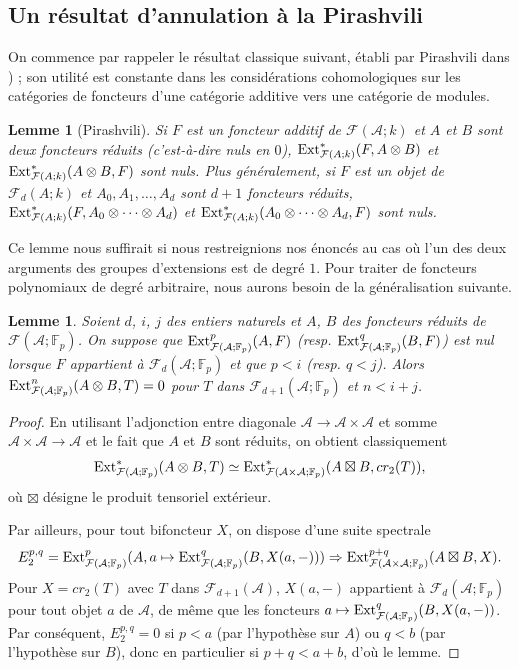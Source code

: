 \documentclass[a4paper,10pt]{article}
\newcommand{\A}{{\mathcal{A}}}
\newcommand{\F}{{\mathcal{F}}}
\newtheorem{lm}[thm]{Lemme}
\theoremstyle{definition}
\theoremstyle{remark}
\begin{document}
\subsection{Un résultat d'annulation à la Pirashvili}

On commence par rappeler le résultat classique suivant, établi par Pirashvili dans \cite{P-add}) ; son utilité est constante dans les considérations cohomologiques sur les catégories de foncteurs d'une catégorie additive vers une catégorie de modules. 

\begin{lm}[Pirashvili]\label{lmpira}
 Si $F$ est un foncteur additif de $\F(\A;k)$ et $A$ et $B$ sont deux foncteurs réduits (c'est-à-dire nuls en $0$), ${\rm Ext}^*_{\F(A;k)}(F,A\otimes B)$ et ${\rm Ext}^*_{\F(A;k)}(A\otimes B,F)$ sont nuls. Plus généralement, si $F$ est un objet de $\F_d(A;k)$ et $A_0,A_1,\dots, A_d$ sont $d+1$ foncteurs réduits, ${\rm Ext}^*_{\F(A;k)}(F,A_0\otimes\dots\otimes A_d)$ et ${\rm Ext}^*_{\F(A;k)}(A_0\otimes\dots\otimes A_d,F)$ sont nuls.
\end{lm}


Ce lemme nous suffirait si nous restreignions nos énoncés au cas où l'un des deux arguments des groupes d'extensions est de degré $1$. Pour traiter de foncteurs polynomiaux de degré arbitraire, nous aurons besoin de la généralisation suivante.

\begin{lm}\label{pira-gl}
 Soient $d$, $i$, $j$ des entiers naturels et $A$, $B$ des foncteurs réduits de $\F(\A;\mathbb{F}_p)$. On suppose que ${\rm Ext}^p_{\F(\A;\mathbb{F}_p)}(A,F)$ (resp. ${\rm Ext}^q_{\F(\A;\mathbb{F}_p)}(B,F)$) est nul lorsque $F$ appartient à $\F_d(\A;\mathbb{F}_p)$ et que $p<i$ (resp. $q<j$). Alors ${\rm Ext}^n_{\F(\A;\mathbb{F}_p)}(A\otimes B,T)=0$ pour $T$ dans $\F_{d+1}(\A;\mathbb{F}_p)$ et $n<i+j$. 
\end{lm}

\begin{proof}
 En utilisant l'adjonction entre diagonale $\A\to\A\times\A$ et somme $\A\times\A\to\A$ et le fait que $A$ et $B$ sont réduits, on obtient classiquement
$${\rm Ext}^*_{\F(\A;\mathbb{F}_p)}(A\otimes B,T)\simeq {\rm Ext}^*_{\F(\A\times\A;\mathbb{F}_p)}(A\boxtimes B,cr_2(T)),$$
où $\boxtimes$ désigne le produit tensoriel extérieur.

Par ailleurs, pour tout bifoncteur $X$, on dispose d'une suite spectrale
$$E_2^{p,q}={\rm Ext}^p_{\F(\A;\mathbb{F}_p)}(A,a\mapsto{\rm Ext}^q_{\F(\A;\mathbb{F}_p)}(B,X(a,-)))\Rightarrow {\rm Ext}^{p+q}_{\F(\A\times\A;\mathbb{F}_p)}(A\boxtimes B,X).$$
Pour $X=cr_2(T)$ avec $T$ dans $\F_{d+1}(\A)$, $X(a,-)$ appartient à $\F_d(\A;\mathbb{F}_p)$ pour tout objet $a$ de $\A$, de même que les foncteurs $a\mapsto {\rm Ext}^q_{\F(\A;\mathbb{F}_p)}(B,X(a,-))$. Par conséquent, $E_2^{p,q}=0$ si $p<a$ (par l'hypothèse sur $A$) ou $q<b$ (par l'hypothèse sur $B$), donc en particulier si $p+q<a+b$, d'où le lemme.
\end{proof}
\end{document}
